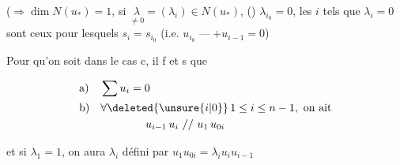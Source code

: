 ($\Rightarrow\dim N(u_*)=1$, si $\underset{\ne0}{\lambda}=(\lambda_i)\in N(u_*)$,  () $\lambda_{i_0}=0$, les  $i$ tels que $\lambda_i=0$ sont ceux pour lesquels $s_i=s_{i_0}$ (i.e. $u_{i_0}\mathbin{\text{---}}+u_{i-1}=0$)


Pour qu'on soit dans le cas c,  il f et s  que

\[
 \begin{aligned}
 &\mathrm a)\quad \sum u_i=0\\
 &\mathrm b)\quad \forall\deleted{\unsure{i|0}}\,1\leq i\leq n-1,\ \text{on ait}\\
 &\hspace{6em} u_{i-1}\,u_i\ //\ u_1\,u_{0i}
 \end{aligned}
\]

et si  $\lambda_1=1$, on aura $\lambda_i$ défini par $u_1u_{0i}=\lambda_i u_i u_{i-1}$

